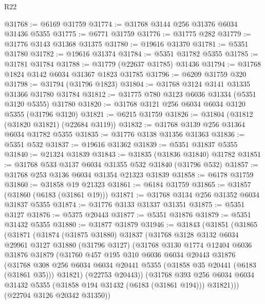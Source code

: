 \begin{lexlean}{R22}
\begin{coremodule}
@31768 := @6169 @31759
@31774 := @31768 @3144 @256 @31376 @6034 @31436 @5355
@31775 := @6771 @31759
@31776 := @31775 @282
@31779 := @31776 @3143 @31368 @31375
@31780 := @19616 @31370
@31781 := @5351 @31780
@31782 := @19616 @31374
@31784 := @5351 @31782 @5355
@31785 := @31781 @31784
@31788 := @31779 (@22637 @31785) @31436
@31794 := @31768 @1824 @3142 @6034 @31367 @1823 @31785
@31796 := @6209 @31759 @320
@31798 := @31794 (@31796 @1823)
@31804 := @31768 @3124 @3141 @31335 @31366 @31780 @31784
@31812 := @31775 @780 @3123 @6036 @31334 (@5351 @3120 @5355) @31780
@31820 := @31768 @3121 @256 @6034 @6034 @3120 @5355 (@31796 @3120)
@31821 := @6215 @31759
@31826 := @31804 (@31812 (@31820 @31821) (@22684 @3119))
@31832 := @31768 @3139 @256 @31364 @6034 @31782 @5355
@31835 := @31776 @3138 @31356 @31363
@31836 := @5351 @532
@31837 := @19616 @31362
@31839 := @5351 @31837 @5355
@31840 := @21324 @31839
@31843 := @31835 (@31836 @31840) @31782
@31851 := @31768 @533 @3137 @6034 @31355 @532 @31840 (@31796 @532)
@31857 := @31768 @253 @3136 @6034 @31354 @21323 @31839
@31858 := @6178 @31759
@31860 := @31858 @19 @21323
@31861 := @6184 @31759
@31865 := @31857 (@31860 (@6183 (@31861 @19)))
@31871 := @31768 @3134 @256 @31352 @6034 @31837 @5355
@31874 := @31776 @3133 @31337 @31351
@31875 := @5351 @3127
@31876 := @5375 @20443
@31877 := @5351 @31876
@31879 := @5351 @31432 @5355
@31880 := @31877 @31879
@31946 := @31843
    (@31851
      (@31865
        (@31871
          (@31874
            (@31875 @31880)
            @31837
            (@31768
              @3128
              @3132
              @6034
              @29961
              @3127
              @31880
              (@31796 @3127)
              (@31768
                @3130
                @1774
                @12404
                @6036
                @31876
                @31879
                (@31760
                  @457
                  @195
                  @310
                  @6036
                  @6034
                  @20443
                  @31876
                  (@31768
                    @308
                    @256
                    @6034
                    @6034
                    @20441
                    @5355
                    (@31858 @35 @20441 (@6183 (@31861 @35)))
                    @31821)
                  (@22753 @20443))
                (@31768
                  @393
                  @256
                  @6034
                  @6034
                  @31432
                  @5355
                  (@31858 @194 @31432 (@6183 (@31861 @194)))
                  @31821)))
            (@22704 @3126 @20342 @31350))

\end{coremodule}
\end{lexlean}
